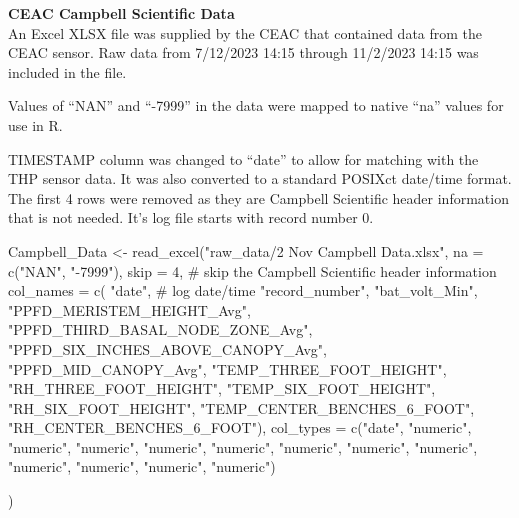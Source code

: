\documentclass[
  letterpaper,
  DIV=11,
  numbers=noendperiod]{scrartcl}
\newenvironment{Shaded}{\begin{snugshade}}{\end{snugshade}}
\newcommand{\AttributeTok}[1]{\textcolor[rgb]{0.40,0.45,0.13}{#1}}
\newcommand{\CommentTok}[1]{\textcolor[rgb]{0.37,0.37,0.37}{#1}}
\newcommand{\DecValTok}[1]{\textcolor[rgb]{0.68,0.00,0.00}{#1}}
\newcommand{\FunctionTok}[1]{\textcolor[rgb]{0.28,0.35,0.67}{#1}}
\newcommand{\NormalTok}[1]{\textcolor[rgb]{0.00,0.23,0.31}{#1}}
\newcommand{\OtherTok}[1]{\textcolor[rgb]{0.00,0.23,0.31}{#1}}
\newcommand{\StringTok}[1]{\textcolor[rgb]{0.13,0.47,0.30}{#1}}
\begin{document}
\textbf{CEAC Campbell Scientific Data}\\
An Excel XLSX file was supplied by the CEAC that contained data from the
CEAC sensor. Raw data from 7/12/2023 14:15 through 11/2/2023 14:15 was
included in the file.

Values of ``NAN'' and ``-7999'' in the data were mapped to native ``na''
values for use in R.

TIMESTAMP column was changed to ``date'' to allow for matching with the
THP sensor data. It was also converted to a standard POSIXct date/time
format.\\
The first 4 rows were removed as they are Campbell Scientific header
information that is not needed. It's log file starts with record number
0.

\begin{Shaded}
\begin{Highlighting}[]
\NormalTok{Campbell\_Data }\OtherTok{\textless{}{-}} \FunctionTok{read\_excel}\NormalTok{(}\StringTok{"raw\_data/2 Nov Campbell Data.xlsx"}\NormalTok{, }
    \AttributeTok{na =} \FunctionTok{c}\NormalTok{(}\StringTok{"NAN"}\NormalTok{, }\StringTok{"{-}7999"}\NormalTok{),}
    \AttributeTok{skip =} \DecValTok{4}\NormalTok{, }\CommentTok{\# skip the Campbell Scientific header information}
  \AttributeTok{col\_names =} \FunctionTok{c}\NormalTok{(}
    \StringTok{"date"}\NormalTok{, }\CommentTok{\# log date/time}
    \StringTok{"record\_number"}\NormalTok{,}
    \StringTok{"bat\_volt\_Min"}\NormalTok{,}
    \StringTok{"PPFD\_MERISTEM\_HEIGHT\_Avg"}\NormalTok{,}
    \StringTok{"PPFD\_THIRD\_BASAL\_NODE\_ZONE\_Avg"}\NormalTok{,}
    \StringTok{"PPFD\_SIX\_INCHES\_ABOVE\_CANOPY\_Avg"}\NormalTok{,}
    \StringTok{"PPFD\_MID\_CANOPY\_Avg"}\NormalTok{,}
    \StringTok{"TEMP\_THREE\_FOOT\_HEIGHT"}\NormalTok{,}
    \StringTok{"RH\_THREE\_FOOT\_HEIGHT"}\NormalTok{,}
    \StringTok{"TEMP\_SIX\_FOOT\_HEIGHT"}\NormalTok{,}
    \StringTok{"RH\_SIX\_FOOT\_HEIGHT"}\NormalTok{,}
    \StringTok{"TEMP\_CENTER\_BENCHES\_6\_FOOT"}\NormalTok{,}
    \StringTok{"RH\_CENTER\_BENCHES\_6\_FOOT"}\NormalTok{),}
  \AttributeTok{col\_types =} \FunctionTok{c}\NormalTok{(}\StringTok{"date"}\NormalTok{, }\StringTok{"numeric"}\NormalTok{, }\StringTok{"numeric"}\NormalTok{, }\StringTok{"numeric"}\NormalTok{,}
                \StringTok{"numeric"}\NormalTok{, }\StringTok{"numeric"}\NormalTok{, }\StringTok{"numeric"}\NormalTok{, }\StringTok{"numeric"}\NormalTok{,}
                \StringTok{"numeric"}\NormalTok{, }\StringTok{"numeric"}\NormalTok{, }\StringTok{"numeric"}\NormalTok{, }\StringTok{"numeric"}\NormalTok{, }\StringTok{"numeric"}\NormalTok{)}
  
\NormalTok{)}
\end{Highlighting}
\end{Shaded}
\end{document}
